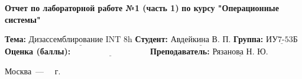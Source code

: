 \begin{titlepage}
	\fontsize{14pt}{14pt}\selectfont
	
	\begin{center}
		\Large\textbf{Отчет по лабораторной работе №1 (часть 1)}\newline
		\Large\textbf {по курсу "Операционные системы"}\newline\newline\newline
	\end{center}
	
	\noindent\textbf{Тема: } $\underline{\text{Дизассемблирование INT 8h}}$\newline\newline
	\noindent\textbf{Студент: } $\underline{\text{Авдейкина В. П.}}$\newline\newline
	\noindent\textbf{Группа: } $\underline{\text{ИУ7-53Б}}$\newline\newline
	\noindent\textbf{Оценка (баллы): } $\underline{\text{~~~~~~~~~~~~~~~~~~~~~~~~~~~}}$\newline\newline
	\noindent\textbf{Преподаватель: } $\underline{\text{Рязанова Н. Ю.}}$\newline\newline\newline
	
	\begin{center}
		\vfill
		Москва~---~\the\year
		~г.
	\end{center}
\end{titlepage}